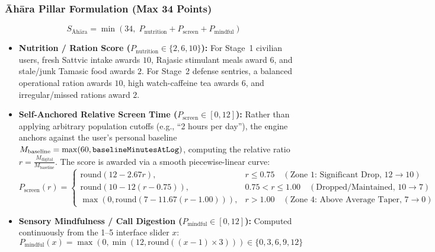 \documentclass[11pt,a4paper]{article}
\begin{document}
\subsubsection{\=Ah\=ara Pillar Formulation (Max 34 Points)}
\begin{equation}
    S_{\text{\=Ah\=ara}} = \min(34,\; P_{\text{nutrition}} + P_{\text{screen}} + P_{\text{mindful}})
\end{equation}
\begin{itemize}[leftmargin=*]
    \item \textbf{Nutrition / Ration Score ($P_{\text{nutrition}} \in \{2, 6, 10\}$):} For Stage~1 civilian users, fresh Sattvic intake awards $10$, Rajasic stimulant meals award $6$, and stale/junk Tamasic food awards $2$. For Stage~2 defense sentries, a balanced operational ration awards $10$, high watch-caffeine tea awards $6$, and irregular/missed rations award $2$.
    \item \textbf{Self-Anchored Relative Screen Time ($P_{\text{screen}} \in [0, 12]$):} Rather than applying arbitrary population cutoffs (e.g., ``2 hours per day''), the engine anchors against the user's personal baseline $M_{\text{baseline}} = \max(60, \text{\texttt{baselineMinutesAtLog}})$, computing the relative ratio $r = \frac{M_{\text{digital}}}{M_{\text{baseline}}}$. The score is awarded via a smooth piecewise-linear curve:
    \begin{equation}
        P_{\text{screen}}(r) = \begin{cases}
            \text{round}(12 - 2.67r), & r \le 0.75 \quad (\text{Zone 1: Significant Drop, } 12 \rightarrow 10) \\
            \text{round}(10 - 12(r - 0.75)), & 0.75 < r \le 1.00 \quad (\text{Dropped/Maintained, } 10 \rightarrow 7) \\
            \max(0, \text{round}(7 - 11.67(r - 1.00))), & r > 1.00 \quad (\text{Zone 4: Above Average Taper, } 7 \rightarrow 0)
        \end{cases}
    \end{equation}
    \item \textbf{Sensory Mindfulness / Call Digestion ($P_{\text{mindful}} \in [0, 12]$):} Computed continuously from the 1--5 interface slider $x$:
    \begin{equation}
        P_{\text{mindful}}(x) = \max(0, \min(12, \text{round}((x - 1) \times 3))) \in \{0, 3, 6, 9, 12\}
    \end{equation}
\end{itemize}
\end{document}

